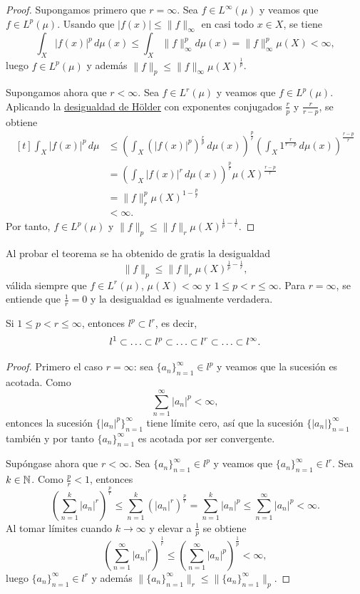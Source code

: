 \documentclass[a4paper, 11pt, oneside]{report}
\begin{document}
\begin{proof}
  Supongamos primero que $r = \infty$. Sea $f \in L^\infty(\mu)$ y veamos que $f \in L^p(\mu)$. Usando que $|f(x)| \leq \|f\|_\infty$ en casi todo $x \in X$, se tiene
  \[\int_X|f(x)|^p \, d\mu(x) \leq \int_X\|f\|_\infty^p d\mu(x) = \|f\|_\infty^p \mu(X) < \infty,\]
  luego $f \in L^p(\mu)$ y además $\|f\|_p \leq \|f\|_\infty \mu(X)^{\frac{1}{p}}$.

  Supongamos ahora que $r<\infty$. Sea $f \in L^r(\mu)$ y veamos que $f\in L^p(\mu)$. Aplicando la \hyperref[teo:1.2.6]{\color{c1}desigualdad de Hölder} con exponentes conjugados $\frac{r}{p}$ y $\frac{r}{r-p}$, se obtiene
  \[
  \begin{aligned}[t]
  \int_X|f(x)|^p \, d\mu &\leq \left(\int_X (|f(x)|^p)^{\frac{r}{p}}\, d\mu(x)\right)^\frac{p}{r}\left(\int_X1^{\frac{r}{r-p}}\, d\mu(x)\right)^{\frac{r-p}{r}} \\ &= \left(\int_X|f(x)|^r\, d\mu(x)\right)^\frac{p}{r}\mu(X)^{\frac{r-p}{r}} \\ &= \|f\|_r^p \mu(X)^{1-\frac{p}{r}} \\
  &< \infty.
  \end{aligned}
  \]
  Por tanto, $f \in L^p(\mu)$ y $\|f\|_p \leq \|f\|_r\mu(X)^{\frac{1}{p}-\frac{1}{r}}$.
\end{proof}

Al probar el teorema se ha obtenido de gratis la desigualdad \[\|f\|_p \leq \|f\|_r\mu(X)^{\frac{1}{p}-\frac{1}{r}},\] válida siempre que $f \in L^r(\mu)$, $\mu(X)<\infty$ y $1 \leq p <r\leq\infty$. Para $r = \infty$, se entiende que $\frac{1}{r} = 0$ y la desigualdad es igualmente verdadera.

\begin{theorem}
  Si $1 \leq p < r \leq \infty$, entonces $l^p \subset l^r$, es decir,
  \[l^1 \subset \mathellipsis \subset l^p \subset \mathellipsis \subset l^r \subset \mathellipsis \subset l^\infty.\]
\end{theorem}

\begin{proof}
  Primero el caso $r= \infty$: sea $\{a_n\}_{n=1}^\infty \in l^p$ y veamos que la sucesión es acotada. Como
  \[\sum_{n=1}^\infty |a_n|^p <\infty,\]
  entonces la sucesión $\{|a_n|^p\}_{n= 1}^\infty$ tiene límite cero, así que la sucesión $\{|a_n|\}_{n=1}^\infty$ también y por tanto $\{a_n\}_{n=1}^\infty$ es acotada por ser convergente.

  Supóngase ahora que $r<\infty$. Sea $\{a_n\}_{n=1}^\infty \in l^p$ y veamos que $\{a_n\}_{n=1}^\infty \in l^r$. Sea $k \in \mathbb N$. Como $\frac{p}{r}<1$, entonces
  \[\left(\sum_{n=1}^k |a_n|^r\right)^{\frac{p}{r}} \leq \sum_{n=1}^k (|a_n|^r)^{\frac{p}{r}} = \sum_{n=1}^k|a_n|^p \leq \sum_{n=1}^\infty |a_n|^p < \infty.\]
  Al tomar límites cuando $k \to \infty$ y elevar a $\frac{1}{p}$ se obtiene
  \[\left(\sum_{n=1}^\infty |a_n|^r\right)^{\frac{1}{r}} \leq \left(\sum_{n=1}^\infty |a_n|^p\right)^\frac{1}{p} < \infty,\]
  luego $\{a_n\}_{n=1}^\infty \in l^r$ y además $\|\{a_n\}_{n=1}^\infty\|_r \leq \|\{a_n\}_{n=1}^\infty\|_p$.
\end{proof}
\end{document}
